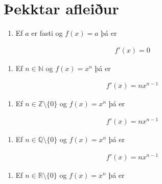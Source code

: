 \documentclass[a4paper,10pt,icelandic]{sphinxmanual}
\begin{document}
\section{Þekktar afleiður}
\label{\detokenize{Kafli11:ekktar-afleiur}}\begin{enumerate}
%
\item {} 
Ef \(a\) er fasti og \(f(x)=a\) þá er

\end{enumerate}
\begin{equation*}
\begin{split}f'(x)=0\end{split}
\end{equation*}\begin{enumerate}
%
\setcounter{enumi}{1}
\item {} 
Ef \(n\in \mathbb{N}\) og \(f(x)=x^n\) þá er

\end{enumerate}
\begin{equation*}
\begin{split}f'(x)=nx^{n-1}\end{split}
\end{equation*}\begin{enumerate}
%
\setcounter{enumi}{2}
\item {} 
Ef \(n\in \mathbb{Z}\setminus\{0\}\) og \(f(x)=x^{n}\) þá er

\end{enumerate}
\begin{equation*}
\begin{split}f'(x)=nx^{n-1}\end{split}
\end{equation*}\begin{enumerate}
%
\setcounter{enumi}{3}
\item {} 
Ef \(n\in \mathbb{Q}\setminus\{0\}\) og \(f(x)=x^n\) þá er

\end{enumerate}
\begin{equation*}
\begin{split}f'(x)=nx^{n-1}\end{split}
\end{equation*}\begin{enumerate}
%
\setcounter{enumi}{4}
\item {} 
Ef \(n\in \mathbb{R}\setminus\{0\}\) og \(f(x)=x^n\) þá er

\end{enumerate}
\end{document}
